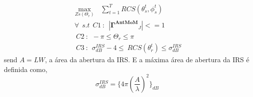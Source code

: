 \documentclass[
	12pt,				%
	openright,			%
	oneside,			%
	a4papey79r,			%
	english,			%
	brazil				%
	]{abntex2}
\begin{document}
\begin{equation}
  \begin{aligned}
          \max_{Zs(\Theta_r)} \ \ \ \sum_{t=1}^{T} RCS(\theta_s^t,\phi_s^t) \\
    \ \forall \ \ s.t \ \ C1 \ : \ \ |  \mathbf{\Gamma^{AntMoM}}_J| <=1 \\
\ \ C2 \ : \ \   -\pi\leq\Theta_r \leq \pi  \\
\ \ C3 \ : \ \     \sigma^{IRS}_{dB}-4\leq  \
RCS(\theta_r^t) \leq   \sigma^{IRS}_{dB}
  \end{aligned}
 
\end{equation}
send $A=LW$, a área da abertura da IRS. E a máxima área de abertura da IRS é definida como, 
\begin{equation}
    \sigma^{IRS}_{dB}=\{4\pi{(\frac{A}{\lambda})}^2\}_{dB}
\end{equation}
\end{document}
